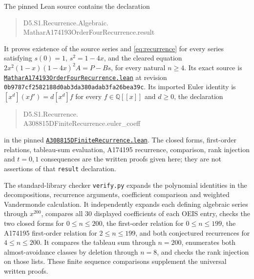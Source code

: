 \documentclass[10pt]{article}
\begin{document}
The pinned Lean source contains the declaration
\begin{quote}\ttfamily\raggedright
D5.S1.Recurrence.Algebraic.\\
MatharA174193OrderFourRecurrence.result
\end{quote}
It proves existence of the
source series and \eqref{eq:recurrence} for every series satisfying
$s(0)=1$, $s^2=1-4x$, and the cleared equation
$2x^2(1-x)(1-4x)^2A=P-Bs$, for every natural $n\geq4$.
Its exact source is
\href{https://github.com/the-omega-institute/trureturing/blob/0b9787cf2582188d0ab3da380adab3fa26bea39c/D5/S1/Recurrence/Algebraic/MatharA174193OrderFourRecurrence.lean}{\texttt{MatharA174193OrderFourRecurrence.lean}}
at revision \texttt{0b9787cf2582188d0ab3da380adab3fa26bea39c}.
Its imported Euler identity is
$[x^d](x f')=d[x^d]f$ for every $f\in\mathbb Q[[x]]$ and $d\geq0$,
the declaration
\begin{quote}\ttfamily\raggedright
D5.S1.Recurrence.\\A308815DFiniteRecurrence.euler\_coeff
\end{quote}
in the pinned
\href{https://github.com/the-omega-institute/trureturing/blob/0b9787cf2582188d0ab3da380adab3fa26bea39c/D5/S1/Recurrence/A308815DFiniteRecurrence.lean}{\texttt{A308815DFiniteRecurrence.lean}}.
The closed forms, first-order relations, tableau-sum evaluation, A174195
recurrence, comparison, rank injection and $t=0,1$ consequences
are the written proofs given here; they are not assertions of that
\texttt{result} declaration.

The standard-library checker \texttt{verify.py} expands the polynomial
identities in the decompositions, recurrence arguments, coefficient
comparison and weighted Vandermonde calculation.
It independently expands each defining algebraic series through
$x^{200}$, compares all 30 displayed coefficients of each OEIS entry,
checks the two closed forms for $0\leq n\leq200$, the first-order relation
for $0\leq n\leq199$, the A174195 first-order relation for $2\leq n\leq199$,
and both conjectured recurrences for $4\leq n\leq200$.
It compares the tableau sum through $n=200$, enumerates both almost-avoidance
classes by deletion through $n=8$, and checks the rank injection on those lists.
These finite sequence comparisons supplement the universal written proofs.
\end{document}
